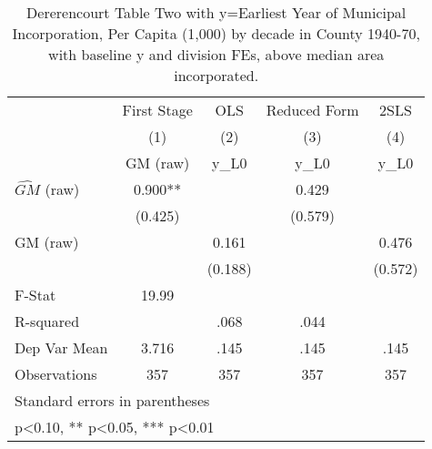 \begin{table}[htbp]\centering
\def\sym#1{\ifmmode^{#1}\else\(^{#1}\)\fi}
\caption{Dererencourt Table Two with y=Earliest Year of Municipal Incorporation, Per Capita (1,000) by decade in County 1940-70, with baseline y and division FEs, above median area incorporated.}
\begin{tabular}{l*{4}{c}}
\toprule
                    & First Stage   &         OLS   &Reduced Form   &        2SLS   \\
                    &\multicolumn{1}{c}{(1)}&\multicolumn{1}{c}{(2)}&\multicolumn{1}{c}{(3)}&\multicolumn{1}{c}{(4)}\\
                    &\multicolumn{1}{c}{GM  (raw)}&\multicolumn{1}{c}{y\_L0}&\multicolumn{1}{c}{y\_L0}&\multicolumn{1}{c}{y\_L0}\\
\midrule
$\hat{GM}$ (raw)    &       0.900** &               &       0.429   &               \\
                    &     (0.425)   &               &     (0.579)   &               \\
\addlinespace
GM  (raw)           &               &       0.161   &               &       0.476   \\
                    &               &     (0.188)   &               &     (0.572)   \\
\midrule
F-Stat              &       19.99   &               &               &               \\
R-squared           &               &        .068   &        .044   &               \\
Dep Var Mean        &       3.716   &        .145   &        .145   &        .145   \\
Observations        &         357   &         357   &         357   &         357   \\
\bottomrule
\multicolumn{5}{l}{\footnotesize Standard errors in parentheses}\\
\multicolumn{5}{l}{\footnotesize * p<0.10, ** p<0.05, *** p<0.01}\\
\end{tabular}
\end{table}
